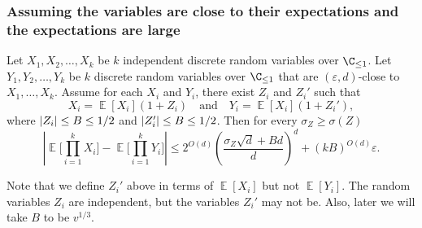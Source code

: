 \documentclass{toc}
\def\eps{\varepsilon}
\DeclarePairedDelimiter{\abs}{\lvert}{\rvert}
\DeclareMathOperator*{\E}{\mathbb{E}}                 %
\begin{document}
  \subsubsection{Assuming the variables are close to their expectations and the expectations are large}

  \begin{lemma} \label{lemma-GKM1}
    Let $X_1, X_2, \ldots, X_k$ be $k$ independent discrete random variables over $\C_{\le 1}$.
    Let $Y_1, Y_2, \ldots, Y_k$ be $k$ discrete random variables over $\C_{\le 1}$ that are $(\eps, d)$-close to $X_1, \ldots, X_k$.
    Assume for each $X_i$ and $Y_i$, there exist $Z_i$ and $Z_i'$ such that
    \[ X_i = \E[X_i] (1 + Z_i) \quad \text{and} \quad Y_i = \E[X_i] (1 + Z_i') , \]
    where $\abs{Z_i} \le B \le 1/2$ and $\abs{Z_i'} \le B \le 1/2$.
    Then for every $\sigma_Z \ge \sigma(Z)$
    \[
      \left| \E \Big[ \prod_{i = 1}^k X_i \Big] - \E \Big[ \prod_{i = 1}^k Y_i \Big] \right| 
      \le 2^{O(d)} \left( \frac{ \sigma_Z \sqrt{d} + B d }{d} \right)^d + (kB)^{O(d)} \eps .
    \]
  \end{lemma}
  \begin{remark}
    Note that we define $Z_i'$ above in terms of $\E[X_i]$ but not $\E[Y_i]$.
    The random variables $Z_i$ are independent, but the variables $Z_i'$ may not be.
    Also, later we will take $B$ to be $v^{1/3}$.
  \end{remark}
\end{document}
